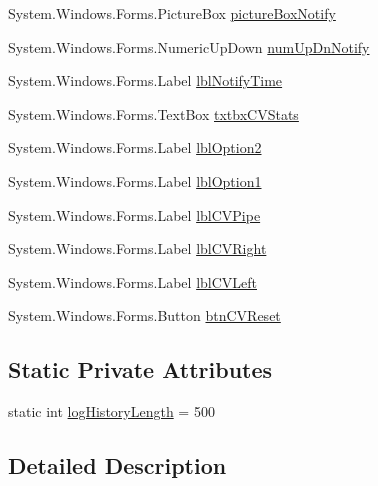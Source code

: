 \begin{DoxyCompactItemize}
\item 
\-System.\-Windows.\-Forms.\-Picture\-Box \hyperlink{class_sr_p___classroom_inq_1_1frm_classrrom_inq_a42edbcd46f526414f654285ab552b75b}{picture\-Box\-Notify}
\item 
\-System.\-Windows.\-Forms.\-Numeric\-Up\-Down \hyperlink{class_sr_p___classroom_inq_1_1frm_classrrom_inq_aaa513f17dd8bb353240daa4c342493cd}{num\-Up\-Dn\-Notify}
\item 
\-System.\-Windows.\-Forms.\-Label \hyperlink{class_sr_p___classroom_inq_1_1frm_classrrom_inq_a4097bd097ccf5dc695605b923b5dcc76}{lbl\-Notify\-Time}
\item 
\-System.\-Windows.\-Forms.\-Text\-Box \hyperlink{class_sr_p___classroom_inq_1_1frm_classrrom_inq_a931a3be146fb3f28b5ee10428a2ac0a4}{txtbx\-C\-V\-Stats}
\item 
\-System.\-Windows.\-Forms.\-Label \hyperlink{class_sr_p___classroom_inq_1_1frm_classrrom_inq_a9d9eb976144ed61fdea34f8f155c46d3}{lbl\-Option2}
\item 
\-System.\-Windows.\-Forms.\-Label \hyperlink{class_sr_p___classroom_inq_1_1frm_classrrom_inq_af7691125c5f216d103385eee848b4fa0}{lbl\-Option1}
\item 
\-System.\-Windows.\-Forms.\-Label \hyperlink{class_sr_p___classroom_inq_1_1frm_classrrom_inq_aa9e310c5de5de60aa7ef8475acab3dde}{lbl\-C\-V\-Pipe}
\item 
\-System.\-Windows.\-Forms.\-Label \hyperlink{class_sr_p___classroom_inq_1_1frm_classrrom_inq_adc1235afb5182767230d7efd1dae80a7}{lbl\-C\-V\-Right}
\item 
\-System.\-Windows.\-Forms.\-Label \hyperlink{class_sr_p___classroom_inq_1_1frm_classrrom_inq_a4759549d1c3966e4a29741e486443c16}{lbl\-C\-V\-Left}
\item 
\-System.\-Windows.\-Forms.\-Button \hyperlink{class_sr_p___classroom_inq_1_1frm_classrrom_inq_a205b60ffd1a3a0dc4149e5562859031c}{btn\-C\-V\-Reset}
\end{DoxyCompactItemize}
\subsection*{\-Static \-Private \-Attributes}
\begin{DoxyCompactItemize}
\item 
static int \hyperlink{class_sr_p___classroom_inq_1_1frm_classrrom_inq_a0b55eb955abb243808249457ac92ca93}{log\-History\-Length} = 500
\end{DoxyCompactItemize}


\subsection{\-Detailed \-Description}


